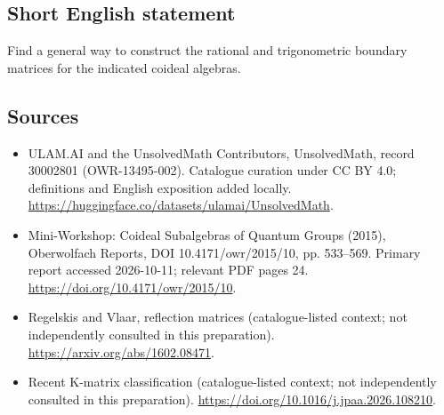 \documentclass[11pt]{article}
\begin{document}
\subsection{Short English statement}
Find a general way to construct the rational and trigonometric boundary matrices for the indicated coideal algebras.
\subsection{Sources}
\begin{itemize}
\item[\hypertarget{source:30002801:1}{S1}] ULAM.AI and the UnsolvedMath Contributors, UnsolvedMath, record 30002801 (OWR-13495-002). Catalogue curation under CC BY 4.0; definitions and English exposition added locally.
\url{https://huggingface.co/datasets/ulamai/UnsolvedMath}.
\item[\hypertarget{source:30002801:2}{S2}] Mini-Workshop: Coideal Subalgebras of Quantum Groups (2015), Oberwolfach Reports, DOI 10.4171/owr/2015/10, pp. 533--569. Primary report accessed 2026-10-11; relevant PDF pages 24.
\url{https://doi.org/10.4171/owr/2015/10}.
\item[\hypertarget{source:30002801:3}{S3}] Regelskis and Vlaar, reflection matrices (catalogue-listed context; not independently consulted in this preparation).
\url{https://arxiv.org/abs/1602.08471}.
\item[\hypertarget{source:30002801:4}{S4}] Recent K-matrix classification (catalogue-listed context; not independently consulted in this preparation).
\url{https://doi.org/10.1016/j.jpaa.2026.108210}.
\end{itemize}
\label{end:30002801}
\end{document}
